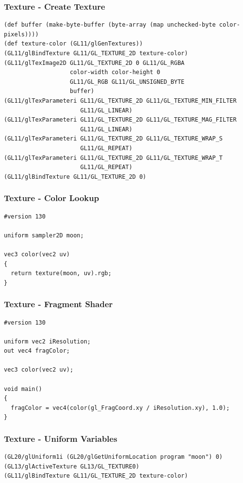 \documentclass[aspectratio=169,11pt,xcolor=dvipsnames]{beamer}
\begin{document}
\begin{frame}[fragile]
  \frametitle{Texture {-} Create Texture}
  \begin{verbatim}
(def buffer (make-byte-buffer (byte-array (map unchecked-byte color-pixels))))
(def texture-color (GL11/glGenTextures))
(GL11/glBindTexture GL11/GL_TEXTURE_2D texture-color)
(GL11/glTexImage2D GL11/GL_TEXTURE_2D 0 GL11/GL_RGBA
                   color-width color-height 0
                   GL11/GL_RGB GL11/GL_UNSIGNED_BYTE
                   buffer)
(GL11/glTexParameteri GL11/GL_TEXTURE_2D GL11/GL_TEXTURE_MIN_FILTER
                      GL11/GL_LINEAR)
(GL11/glTexParameteri GL11/GL_TEXTURE_2D GL11/GL_TEXTURE_MAG_FILTER
                      GL11/GL_LINEAR)
(GL11/glTexParameteri GL11/GL_TEXTURE_2D GL11/GL_TEXTURE_WRAP_S
                      GL11/GL_REPEAT)
(GL11/glTexParameteri GL11/GL_TEXTURE_2D GL11/GL_TEXTURE_WRAP_T
                      GL11/GL_REPEAT)
(GL11/glBindTexture GL11/GL_TEXTURE_2D 0)
  \end{verbatim}
\end{frame}

\begin{frame}[fragile]
  \frametitle{Texture {-} Color Lookup}
  \begin{verbatim}
#version 130

uniform sampler2D moon;

vec3 color(vec2 uv)
{
  return texture(moon, uv).rgb;
}
  \end{verbatim}
\end{frame}

\begin{frame}[fragile]
  \frametitle{Texture {-} Fragment Shader}
  \begin{verbatim}
#version 130

uniform vec2 iResolution;
out vec4 fragColor;

vec3 color(vec2 uv);

void main()
{
  fragColor = vec4(color(gl_FragCoord.xy / iResolution.xy), 1.0);
}
  \end{verbatim}
\end{frame}

\begin{frame}[fragile]
  \frametitle{Texture {-} Uniform Variables}
  \begin{verbatim}
(GL20/glUniform1i (GL20/glGetUniformLocation program "moon") 0)
(GL13/glActiveTexture GL13/GL_TEXTURE0)
(GL11/glBindTexture GL11/GL_TEXTURE_2D texture-color)
  \end{verbatim}
\end{frame}
\end{document}
